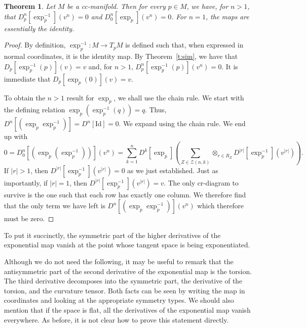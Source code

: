 \documentclass[11pt]{article}
\newtheorem{theorem}{Theorem}
\theoremstyle{remark}
\begin{document}
\begin{theorem} \label{tt:exps}
Let $M$ be a cc-manifold. Then for every $p \in M$, 
we have, for $n >1$, that  $\ensuremath{D_{p}^{n} {[\ensuremath{\exp^{-1}_{p}{}}]} ({v^{n}}) } = 0$ 
and $\ensuremath{D_{0}^{n} {[\ensuremath{\exp_{p}{}}]} ({v^{n}}) } = 0$. For $n=1$, the maps are
essentially the identity.
\end{theorem}

\begin{proof}
By definition, $\ensuremath{\exp^{-1}_{p}{}}:M \to \ensuremath{T_p M}$ is defined such that, when expressed in
normal coordinates, it is the identity map. By Theorem~\ref{t:sim},
we have that  $\ensuremath{D_{p}^{} {[\ensuremath{\exp^{-1}_{p}{(p)}}]} ({v}) } = v$  and, for $n > 1$,  
$\ensuremath{D_{p}^{n} {[\ensuremath{\exp^{-1}_{p}{(p)}}]} ({v^n}) } = 0$. It is immediate that 
$\ensuremath{D_{p}^{} {[\ensuremath{\exp_{p}{(0)}}]} ({v}) } = v$.

To obtain the $n>1$ result for \ensuremath{\exp_{p}{}}, we shall use the chain rule. We
start with the defining relation $\ensuremath{\exp_{p}{(\ensuremath{\exp^{-1}_{p}{(q)}})}} = q$. Thus,  
$\ensuremath{D^{n} [{(\ensuremath{\exp_{p}{\ensuremath{\exp^{-1}_{p}{}}}})}] {} } = \ensuremath{D^{n} [{\mathrm{Id}}] {} }=0$. 
We expand using the chain rule. 
We end up with 
\[
0 = \ensuremath{D_{0}^{n} {[(\ensuremath{\exp_{p}{(\ensuremath{\exp^{-1}_{p}{}})}})]} ({v^n}) } 
=  \sum_{k =1}^n \ensuremath{D^{k} [{\ensuremath{\exp_{p}{}}}] ({\sum_{\ensuremath{Z} \in \ensuremath{\mathcal{\ensuremath{Z}}}(n,k)}
{\mathop{\otimes}_{r \in R_{\ensuremath{Z}}} \ensuremath{D^{|r|} [{\ensuremath{\exp^{-1}_{p}{}}}] ({ 
 v^{|r|}}) }}}) }.
\]
If $ |r| >1$, then  $\ensuremath{D^{|r|} [{\ensuremath{\exp^{-1}_{p}{}}}] ({  v^{|r|}}) } =0$ as
we just established. Just as importantly, if $ |r| =1$, then $\ensuremath{D^{|r|} [{\ensuremath{\exp^{-1}_{p}{}}}] ({
v^{|r|}}) } =v$. The only cr-diagram to survive is the one such that each
row has exactly one column. 
We therefore find that the only term we have
left is $\ensuremath{D^{n} [{(\ensuremath{\exp_{p}{\ensuremath{\exp^{-1}_{p}{}}}})}] ({v^n}) }$ which therefore must
be zero.
\end{proof}

To put it succinctly, the symmetric part of the 
higher derivatives of the exponential map
vanish at the point whose tangent space is being exponentiated. 

Although we do not need the following, it may be useful to remark that
the antisymmetric part of the second derivative of the exponential map
is the torsion. The third derivative decomposes into the symmetric
part, the derivative of the torsion, and the curvature tensor. Both
facts 
can be seen by writing the map in coordinates and looking at the appropriate
symmetry types. We should also mention that if the space is flat, all
the derivatives of the exponential map vanish everywhere. As before,
it is not clear how to prove this statement directly. 
\end{document}
